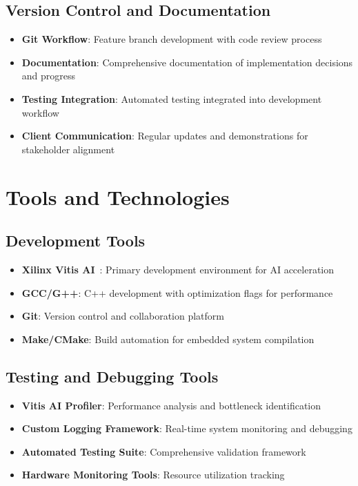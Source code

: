 \subsection{Version Control and Documentation}\label{subsec:version-control}

\begin{itemize}
\item \textbf{Git Workflow}: Feature branch development with code review process
\item \textbf{Documentation}: Comprehensive documentation of implementation decisions and progress
\item \textbf{Testing Integration}: Automated testing integrated into development workflow
\item \textbf{Client Communication}: Regular updates and demonstrations for stakeholder alignment
\end{itemize}

\section{Tools and Technologies}\label{subsec:tools-technologies}

\subsection{Development Tools}\label{subsec:development-tools}

\begin{itemize}
\item \textbf{Xilinx Vitis AI}~\cite{amd2023vitis}: Primary development environment for AI acceleration
\item \textbf{GCC/G++}: C++ development with optimization flags for performance
\item \textbf{Git}: Version control and collaboration platform
\item \textbf{Make/CMake}: Build automation for embedded system compilation
\end{itemize}

\subsection{Testing and Debugging Tools}\label{subsec:testing-tools}

\begin{itemize}
\item \textbf{Vitis AI Profiler}: Performance analysis and bottleneck identification
\item \textbf{Custom Logging Framework}: Real-time system monitoring and debugging
\item \textbf{Automated Testing Suite}: Comprehensive validation framework
\item \textbf{Hardware Monitoring Tools}: Resource utilization tracking
\end{itemize}

